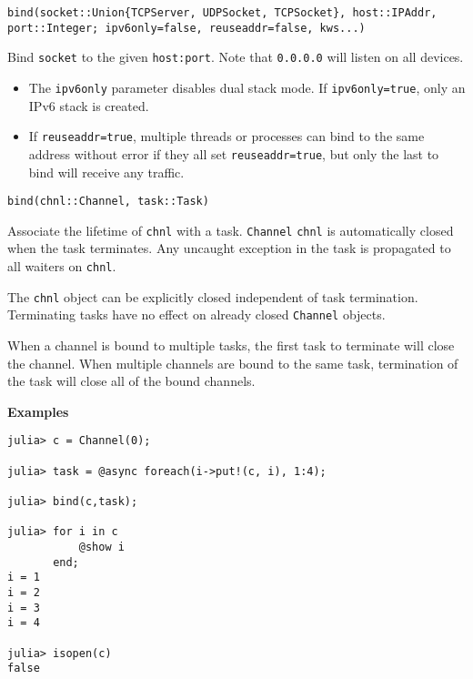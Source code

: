 \begin{adjustwidth}{2em}{0pt}


\begin{verbatim}
bind(socket::Union{TCPServer, UDPSocket, TCPSocket}, host::IPAddr, port::Integer; ipv6only=false, reuseaddr=false, kws...)
\end{verbatim}

Bind \texttt{socket} to the given \texttt{host:port}. Note that \texttt{0.0.0.0} will listen on all devices.

\begin{itemize}
\item The \texttt{ipv6only} parameter disables dual stack mode. If \texttt{ipv6only=true}, only an IPv6 stack is created.


\item If \texttt{reuseaddr=true}, multiple threads or processes can bind to the same address without error if they all set \texttt{reuseaddr=true}, but only the last to bind will receive any traffic.

\end{itemize}



\begin{verbatim}
bind(chnl::Channel, task::Task)
\end{verbatim}

Associate the lifetime of \texttt{chnl} with a task. \texttt{Channel} \texttt{chnl} is automatically closed when the task terminates. Any uncaught exception in the task is propagated to all waiters on \texttt{chnl}.

The \texttt{chnl} object can be explicitly closed independent of task termination. Terminating tasks have no effect on already closed \texttt{Channel} objects.

When a channel is bound to multiple tasks, the first task to terminate will close the channel. When multiple channels are bound to the same task, termination of the task will close all of the bound channels.

\textbf{Examples}


\begin{verbatim}
julia> c = Channel(0);

julia> task = @async foreach(i->put!(c, i), 1:4);

julia> bind(c,task);

julia> for i in c
           @show i
       end;
i = 1
i = 2
i = 3
i = 4

julia> isopen(c)
false
\end{verbatim}



\end{adjustwidth}
